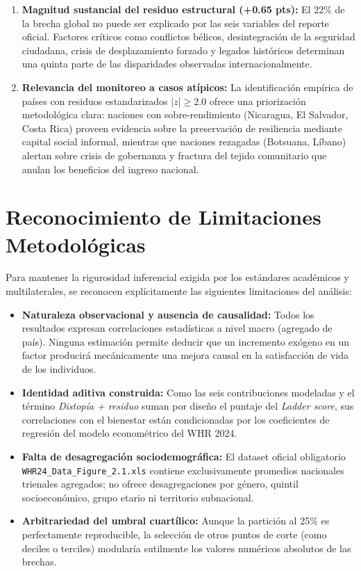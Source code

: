 \documentclass[11pt]{article}
\begin{document}
\begin{enumerate}[leftmargin=1.5em, itemsep=0.35em]
    \item \textbf{Magnitud sustancial del residuo estructural (+0.65 pts):} El 22\% de la brecha global no puede ser explicado por las seis variables del reporte oficial. Factores críticos como conflictos bélicos, desintegración de la seguridad ciudadana, crisis de desplazamiento forzado y legados históricos determinan una quinta parte de las disparidades observadas internacionalmente.
    \item \textbf{Relevancia del monitoreo a casos atípicos:} La identificación empírica de países con residuos estandarizados $|z| \ge 2.0$ ofrece una priorización metodológica clara: naciones con sobre-rendimiento (Nicaragua, El Salvador, Costa Rica) proveen evidencia sobre la preservación de resiliencia mediante capital social informal, mientras que naciones rezagadas (Botsuana, Líbano) alertan sobre crisis de gobernanza y fractura del tejido comunitario que anulan los beneficios del ingreso nacional.
\end{enumerate}

\section{Reconocimiento de Limitaciones Metodológicas}

Para mantener la rigurosidad inferencial exigida por los estándares académicos y multilaterales, se reconocen explícitamente las siguientes limitaciones del análisis:

\begin{itemize}
    \item \textbf{Naturaleza observacional y ausencia de causalidad:} Todos los resultados expresan correlaciones estadísticas a nivel macro (agregado de país). Ninguna estimación permite deducir que un incremento exógeno en un factor producirá mecánicamente una mejora causal en la satisfacción de vida de los individuos.
    \item \textbf{Identidad aditiva construida:} Como las seis contribuciones modeladas y el término \textit{Distopía + residuo} suman por diseño el puntaje del \textit{Ladder score}, sus correlaciones con el bienestar están condicionadas por los coeficientes de regresión del modelo econométrico del WHR 2024.
    \item \textbf{Falta de desagregación sociodemográfica:} El dataset oficial obligatorio \texttt{WHR24\_Data\_Figure\_2.1.xls} contiene exclusivamente promedios nacionales trienales agregados; no ofrece desagregaciones por género, quintil socioeconómico, grupo etario ni territorio subnacional.
    \item \textbf{Arbitrariedad del umbral cuartílico:} Aunque la partición al 25\% es perfectamente reproducible, la selección de otros puntos de corte (como deciles o terciles) modularía sutilmente los valores numéricos absolutos de las brechas.
\end{itemize}
\end{document}
